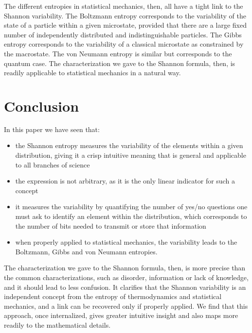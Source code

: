 \documentclass[iopart]{revtex4-1}
\begin{document}
The different entropies in statistical mechanics, then, all have a tight link to the Shannon variability. The Boltzmann entropy corresponds to the variability of the state of a particle within a given microstate, provided that there are a large fixed number of independently distributed and indistinguishable particles. The Gibbs entropy corresponds to the variability of a classical microstate as constrained by the macrostate. The von Neumann entropy is similar but corresponds to the quantum case. The characterization we gave to the Shannon formula, then, is readily applicable to statistical mechanics in a natural way. 

\section{Conclusion}

In this paper we have seen that:
\begin{itemize}
	\item the Shannon entropy measures the variability of the elements within a given distribution, giving it a crisp intuitive meaning that is general and applicable to all branches of science
	\item the expression is not arbitrary, as it is the only linear indicator for such a concept
	\item it measures the variability by quantifying the number of yes/no questions one must ask to identify an element within the distribution, which corresponds to the number of bits needed to transmit or store that information
	\item when properly applied to statistical mechanics, the variability leads to the Boltzmann, Gibbs and von Neumann entropies.
\end{itemize}
The characterization we gave to the Shannon formula, then, is more precise than the common characterizations, such as disorder, information or lack of knowledge, and it should lead to less confusion. It clarifies that the Shannon variability is an independent concept from the entropy of thermodynamics and statistical mechanics, and a link can be recovered only if properly applied. We find that this approach, once internalized, gives greater intuitive insight and also maps more readily to the mathematical details.

  

\end{document}
